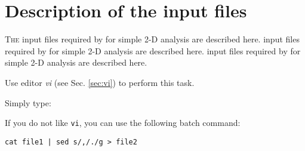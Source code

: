 \chapter{Description of the input files\label{chap:general}}

\lettrine[lines=2, loversize=0.0, lraise=0.5]{T}{he} input files required by \diva for simple 2-D analysis are described here. input files required by \diva for simple 2-D analysis are described here.
input files required by \diva for simple 2-D analysis are described here.




\minitoc

\newpage %




%
%

\begin{center}
\end{center}


\btips

Use editor \textsl{vi} (see Sec. \ref{sec:vi}) to perform this task.

Simply type:

\etips


\btips

If you do not like \texttt{vi}, you can use the following batch command:
\begin{verbatim}
cat file1 | sed s/,/./g > file2
\end{verbatim}

